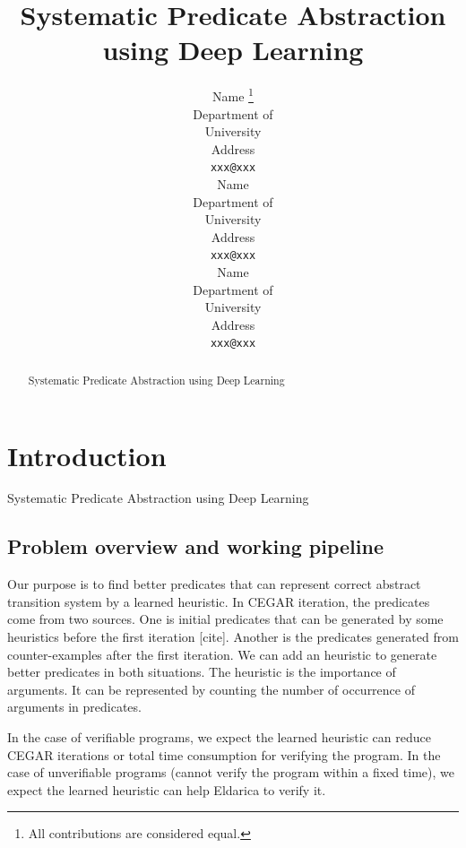 \documentclass{article}
\title{Systematic Predicate Abstraction using Deep Learning}
\author{
  Name \thanks{All contributions are considered equal.}\\
  Department of \\
   University\\
  Address \\
  \texttt{xxx@xxx} \\
   \And
 Name \samethanks\\
  Department of \\
   University\\
  Address \\
  \texttt{xxx@xxx} \\
     \And
 Name \samethanks\\
  Department of \\
   University\\
  Address \\
  \texttt{xxx@xxx} \\
}
\begin{document}
\maketitle

\begin{abstract}
Systematic Predicate Abstraction using Deep Learning
\end{abstract}




\section{Introduction}
Systematic Predicate Abstraction using Deep Learning




\subsection{Problem overview and working pipeline}

Our purpose is to find better predicates that can represent correct abstract transition system by a learned heuristic. In CEGAR iteration, the predicates come from two sources. One is initial predicates that can be generated by some heuristics before the first iteration [cite]. Another is the predicates generated from counter-examples after the first iteration. We can add an heuristic to generate better predicates in both situations. The heuristic is the importance of arguments. It can be represented by counting the number of occurrence of arguments in predicates.

In the case of verifiable programs, we expect the learned heuristic can reduce CEGAR iterations or total time consumption for verifying the program. In the case of unverifiable programs (cannot verify the program within a fixed time), we expect the learned heuristic can help Eldarica to verify it.
\end{document}
